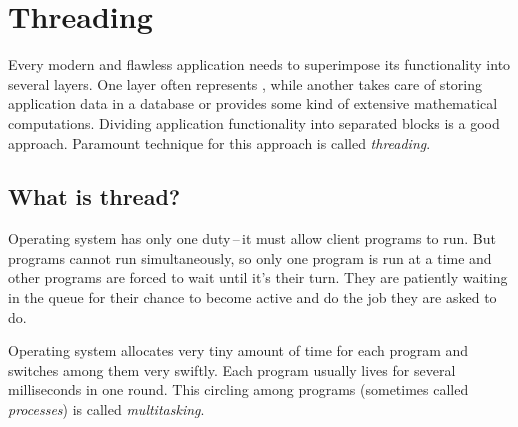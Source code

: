 \chapter{Threading}\label{section:thread}
Every modern and flawless application needs to superimpose its functionality into several layers. One layer often represents , while another takes care of storing application data in a database or provides some kind of extensive mathematical computations. Dividing application functionality into separated blocks is a good approach. Paramount technique for this approach is called \textit{threading}.

\section{What is thread?}
Operating system has only one duty\,--\,it must allow client programs to run. But programs cannot run simultaneously, so only one program is run at a time and other programs are forced to wait until it's their turn. They are patiently waiting in the queue for their chance to become active and do the job they are asked to do. 

Operating system allocates very tiny amount of time for each program and switches among them very swiftly. Each program usually lives for several milliseconds in one round. This circling among programs (sometimes called \textit{processes}) is called \textit{multitasking}.


